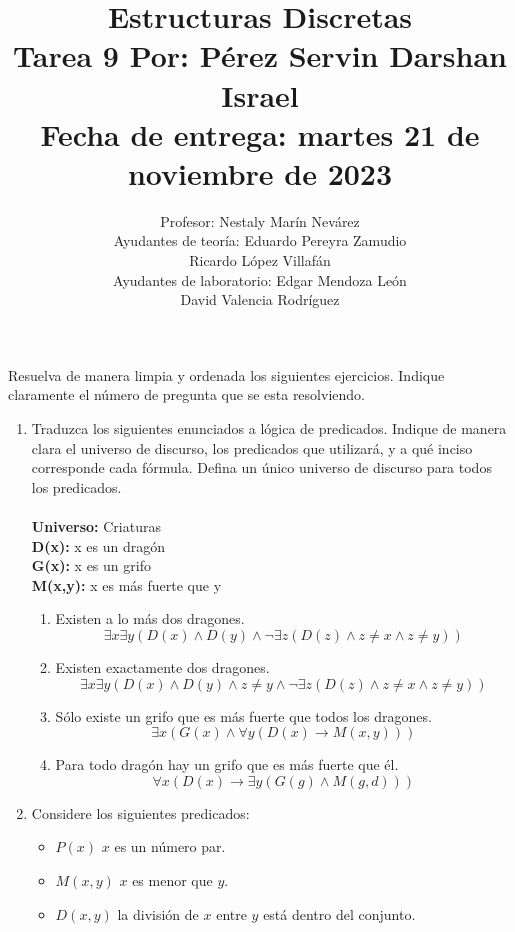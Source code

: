 \documentclass[a4paper,10pt]{article}
\title{Estructuras Discretas\\Tarea 9 \textbf{Por: P\'erez Servin Darshan Israel}\\ Fecha de entrega: martes 21 de noviembre de 2023}
\author{Profesor: Nestaly Mar\'in Nev\'arez \\ Ayudantes de teor\'ia: Eduardo Pereyra Zamudio  \\ \phantom{Ayudantes de teor\'ia:} Ricardo L\'opez Villaf\'an \phantom{aa}\\ Ayudantes de laboratorio: Edgar Mendoza Le\'on \phantom{aaai}\\ \phantom{Ayudantes de laboratorio:} David Valencia Rodr\'iguez}
\date{}
\begin{document}
\maketitle

\vspace{-15pt}
Resuelva de manera limpia y ordenada los siguientes ejercicios. 
Indique claramente el n\'umero de pregunta que se esta resolviendo.


\begin{enumerate}

	\item {} Traduzca los siguientes enunciados a l\'ogica de predicados. 
  Indique de manera clara el universo de discurso, los predicados que utilizar\'a, y a qu\'e inciso corresponde cada f\'ormula. Defina un \'unico universo de discurso para todos los predicados.\\
    \\ \textbf{Universo:} Criaturas
    \\ \textbf{D(x):} x es un drag\'on
    \\ \textbf{G(x):} x es un grifo
    \\ \textbf{M(x,y):} x es m\'as fuerte que y
  \begin{enumerate}    
    \item Existen a lo m\'as dos dragones.
    $$\exists x \exists y (D(x) \wedge D(y) \wedge \neg \exists z (D(z) \wedge z \neq x \wedge z \neq y))$$
    \item Existen exactamente dos dragones.
    $$\exists x \exists y (D(x) \wedge D(y) \wedge z \neq y \wedge \neg \exists z (D(z) \wedge z \neq x \wedge z \neq y))$$
    \item S\'olo existe un grifo que es m\'as fuerte que todos los dragones.
    $$\exists x (G(x) \wedge \forall y(D(x) \to M(x,y)))$$
    \item Para todo drag\'on hay un grifo que es m\'as fuerte que \'el.
    $$\forall x(D(x) \to \exists y ( G(g) \wedge M(g, d)))$$
  \end{enumerate}
  
 \item {} Considere los siguientes predicados:
  \begin{itemize}
    \item $P(x)$ $x$ es un n\'umero par.
    \item $M(x,y)$ $x$ es menor que $y$.
    \item $D(x,y)$ la divisi\'on de $x$ entre $y$ est\'a dentro del conjunto.
  \end{itemize}


\end{enumerate}
\end{document}
